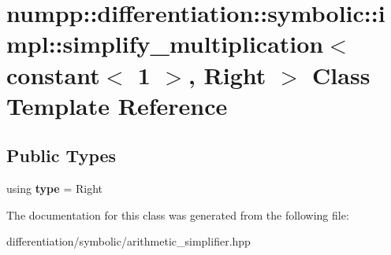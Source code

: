 \hypertarget{classnumpp_1_1differentiation_1_1symbolic_1_1impl_1_1simplify__multiplication_3_01constant_3_011_01_4_00_01Right_01_4}{}\section{numpp\+:\+:differentiation\+:\+:symbolic\+:\+:impl\+:\+:simplify\+\_\+multiplication$<$ constant$<$ 1 $>$, Right $>$ Class Template Reference}
\label{classnumpp_1_1differentiation_1_1symbolic_1_1impl_1_1simplify__multiplication_3_01constant_3_011_01_4_00_01Right_01_4}
\subsection*{Public Types}
\begin{DoxyCompactItemize}
\item 
\mbox{\label{classnumpp_1_1differentiation_1_1symbolic_1_1impl_1_1simplify__multiplication_3_01constant_3_011_01_4_00_01Right_01_4_a031790197776d2d796b9d054c69187b6}} 
using {\bfseries type} = Right
\end{DoxyCompactItemize}


The documentation for this class was generated from the following file\+:\begin{DoxyCompactItemize}
\item 
differentiation/symbolic/arithmetic\+\_\+simplifier.\+hpp\end{DoxyCompactItemize}
